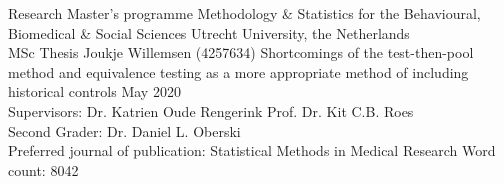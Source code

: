 \documentclass[Royal,sagev,times]{sagej}
\begin{document}











\begin{large}

{\selectfont

\:
\:

\noindent Research Master’s programme \newline
Methodology \& Statistics for the Behavioural,  Biomedical \& Social Sciences \newline
Utrecht University, the Netherlands \\[4\baselineskip]

\noindent MSc Thesis Joukje Willemsen (4257634) \newline
Shortcomings of the test-then-pool method and equivalence testing as a more appropriate method of including historical controls \newline
May 2020 \\[4\baselineskip]

\noindent Supervisors: \newline
Dr. Katrien Oude Rengerink \newline
Prof. Dr. Kit C.B. Roes \\[2\baselineskip]

\noindent Second Grader: \newline
Dr. Daniel L. Oberski \\[4\baselineskip]

\noindent Preferred journal of publication: Statistical Methods in Medical Research \newline
Word count: 8042
}

\end{large}
\end{document}
